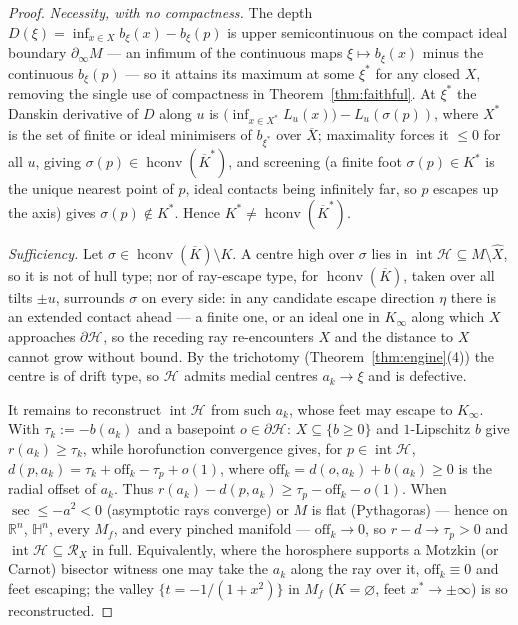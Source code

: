 \documentclass[11pt]{article}
\theoremstyle{remark}
\newcommand{\R}{\mathbb{R}}
\newcommand{\X}{X}
\newcommand{\Xhat}{\widehat{\X}}
\newcommand{\Rx}{\mathcal{R}_{\X}}
\newcommand{\Hb}[1]{\mathcal{H}_{#1}}
\newcommand{\hconv}{\operatorname{hconv}}
\newcommand{\Mf}{M_{f}}
\newcommand{\bdry}{\partial_{\infty}}
\newcommand{\HH}{\mathbb{H}}
\begin{document}
\begin{proof}
\emph{Necessity, with no compactness.} The depth
$D(\xi)=\inf_{x\in X}b_{\xi}(x)-b_{\xi}(p)$ is upper semicontinuous on
the compact ideal boundary $\bdry M$ --- an infimum of the continuous
maps $\xi\mapsto b_{\xi}(x)$ minus the continuous $b_{\xi}(p)$ --- so it
attains its maximum at some $\xi^{\ast}$ for any closed $X$, removing
the single use of compactness in Theorem~\ref{thm:faithful}. At
$\xi^{\ast}$ the Danskin derivative of $D$ along $u$ is
$\bigl(\inf_{x\in X^{\ast}}L_{u}(x)\bigr)-L_{u}(\sigma(p))$, where
$X^{\ast}$ is the set of finite or ideal minimisers of
$b_{\xi^{\ast}}$ over $\overline{X}$; maximality forces it $\le0$ for
all $u$, giving $\sigma(p)\in\hconv(\overline{K}^{\ast})$, and
screening (a finite foot $\sigma(p)\in K^{\ast}$ is the unique nearest
point of $p$, ideal contacts being infinitely far, so $p$ escapes up
the axis) gives $\sigma(p)\notin K^{\ast}$. Hence $K^{\ast}\neq
\hconv(\overline{K}^{\ast})$.

\emph{Sufficiency.} Let $\sigma\in\hconv(\overline{K})\setminus K$. A
centre high over $\sigma$ lies in
$\operatorname{int}\Hb{}\subseteq M\setminus\Xhat$, so it is not of
hull type; nor of ray-escape type, for $\hconv(\overline{K})$, taken
over all tilts $\pm u$, surrounds $\sigma$ on every side: in any
candidate escape direction $\eta$ there is an extended contact ahead
--- a finite one, or an ideal one in $K_{\infty}$ along which $X$
approaches $\partial\Hb{}$, so the receding ray re-encounters $X$ and
the distance to $X$ cannot grow without bound. By the trichotomy
(Theorem~\ref{thm:engine}(4)) the centre is of drift type, so $\Hb{}$
admits medial centres $a_{k}\to\xi$ and is defective.

It remains to reconstruct $\operatorname{int}\Hb{}$ from such $a_{k}$,
whose feet may escape to $K_{\infty}$. With $\tau_{k}:=-b(a_{k})$ and a
basepoint $o\in\partial\Hb{}$: $X\subseteq\{b\ge0\}$ and $1$-Lipschitz
$b$ give $r(a_{k})\ge\tau_{k}$, while horofunction convergence gives,
for $p\in\operatorname{int}\Hb{}$,
$d(p,a_{k})=\tau_{k}+\mathrm{off}_{k}-\tau_{p}+o(1)$, where
$\mathrm{off}_{k}=d(o,a_{k})+b(a_{k})\ge0$ is the radial offset of
$a_{k}$. Thus $r(a_{k})-d(p,a_{k})\ge\tau_{p}-\mathrm{off}_{k}-o(1)$.
When $\sec\le-a^{2}<0$ (asymptotic rays converge) or $M$ is flat
(Pythagoras) --- hence on $\R^{n}$, $\HH^{n}$, every $\Mf$, and every
pinched manifold --- $\mathrm{off}_{k}\to0$, so $r-d\to\tau_{p}>0$ and
$\operatorname{int}\Hb{}\subseteq\Rx$ in full. Equivalently, where the
horosphere supports a Motzkin (or Carnot) bisector witness one may take
the $a_{k}$ along the ray over it, $\mathrm{off}_{k}\equiv0$ and feet
escaping; the valley $\{t=-1/(1+x^{2})\}$ in $\Mf$ ($K=\varnothing$,
feet $x^{\ast}\to\pm\infty$) is so reconstructed.
\end{proof}
\end{document}
